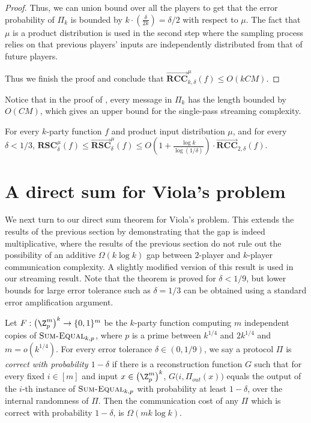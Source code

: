 \documentclass{toc}
\newcommand{\zo}{\ensuremath{ \{ 0, 1 \} }}
\newcommand{\error}{\ensuremath{\delta}}
\newcommand{\bigo}[1]{\ensuremath{{{O} \left( {#1} \right)}}}
\newcommand{\bigomega}[1]{\ensuremath{{\Omega \left( {#1} \right)}}}
\newcommand{\rsc}{\ensuremath{\mathbf{RSC}}}
\newcommand{\rccone}{\ensuremath{\overrightarrow{\mathbf{RCC}}}}
\newcommand{\rscone}{\ensuremath{\overrightarrow{\mathbf{RSC}}}}
\newcommand{\sumequal}{\textsc{Sum-Equal} }
\begin{document}
\begin{proof}
Thus, we can union bound over all the players to get that the error probability of $\Pi_k$ is bounded by $k\cdot (\frac{\error}{2k})=\error/2$ with respect to $\mu$.
The fact that $\mu$ is a product distribution is used in the second step where the sampling process relies on that previous players' inputs are independently distributed from that of future players.

Thus we finish the proof and conclude that 
$\rccone_{k,\error}^{\mu}(f)\le \bigo{kCM}$.
\end{proof}


Notice that in the proof of , every message in $\Pi_k$ has the length bounded by $\bigo{CM}$, which gives an upper bound for the single-pass streaming complexity.

\begin{corollary}\label{corollary:separation upper bound}
For every $k$-party function $f$ and product input distribution $\mu$, and for every $\error < 1/3$, 
$\rsc_{\error}^{\mu}(f) \le\rscone_{\error}^{\mu}(f) \le  \bigo{1+\frac{\log k}{\log(1/\error)}} \cdot \rccone_{2,\error}(f).$
\end{corollary}

\section{A direct sum for Viola's problem}
We next turn to our direct sum theorem for Viola's problem. {\color{black}This extends the results of the previous section by demonstrating that the gap is indeed multiplicative, where the results of the previous section do not rule out the possibility of an additive $\Omega(k \log k)$ gap between $2$-player and $k$-player communication complexity. A slightly modified version of this result is used in our streaming result.}
Note that the theorem is proved for $\error < 1/9$, but lower bounds for large error tolerance such as $\error=1/3$ can be obtained using a standard error amplification argument.

	\begin{theorem}\label{thm:A1}
		Let $F:\left(\Z_p^m\right)^k \to \zo^m$ be the $k$-party function computing $m$ independent copies of $\sumequal_{k,p}$, where $p$ is a prime between $k^{1/4}$ and $2k^{1/4}$ {\color{black}and $m = o(k^{1/4})$.}
		For every error tolerance $\error\in(0,1/9)$,  
        we say a protocol $\Pi$ is \emph{correct with probability $1-\error$}
		if there is a reconstruction
		function $G$ such that for every fixed $i \in [m]$ and input $x\in \left(\Z_p^m\right)^k$, $G\big(i, \Pi_{out}(x)\big)$ equals the
		output of the $i$-th instance of $\sumequal_{k,p}$ with probability at least
		$1-\error$, over the internal randomness of $\Pi$. 
		Then the communication cost of any $\Pi$ which is correct with probability $1-\error$, is $\bigomega{m k\log k}$.
	\end{theorem}
\end{document}

